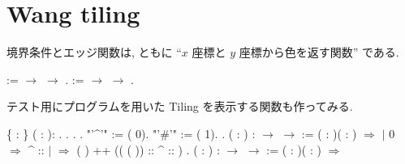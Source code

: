 \documentclass[12pt]{report}
\begin{document}
\section{Wang tiling}
境界条件とエッジ関数は, ともに ``$x$ 座標と $y$ 座標から色を返す関数'' である.
  \begin{coqdoccode}
\coqdocemptyline
\coqdocnoindent
{}  :=  \ensuremath{\rightarrow}  \ensuremath{\rightarrow} .\coqdoceol
\coqdocnoindent
{}  :=  \ensuremath{\rightarrow}  \ensuremath{\rightarrow} .\coqdoceol
\coqdocemptyline
\end{coqdoccode}

テスト用にプログラムを用いた Tiling を表示する関数も作ってみる.
  \begin{coqdoccode}
\coqdocemptyline
\coqdocnoindent
{}  \{ : \} ( : ): .\coqdoceol
\coqdocnoindent
{}.\coqdoceol
\coqdocnoindent
{} .\coqdoceol
\coqdocnoindent
{}.\coqdoceol
\coqdocnoindent
{} "'\^{}'" := ( 0).\coqdoceol
\coqdocnoindent
{} "'\#'" := ( 1).\coqdoceol
\coqdocnoindent
{}  .\coqdoceol
\coqdocnoindent
{}  ( : ) :  \ensuremath{\rightarrow}  \ensuremath{\rightarrow}   :=\coqdoceol
\coqdocindent{0.50em}
 ( : )( : ) \ensuremath{\Rightarrow}\coqdoceol
\coqdocindent{0.50em}
  \coqdoceol
\coqdocindent{1.50em}
\ensuremath{|} 0 \ensuremath{\Rightarrow} \^{} :: \coqdoceol
\coqdocindent{1.50em}
\ensuremath{|}   \ensuremath{\Rightarrow} (   ) ++ ((  ( )) :: \^{} :: )\coqdoceol
\coqdocindent{0.50em}
.\coqdoceol
\coqdocnoindent
{}  ( : ) :  \ensuremath{\rightarrow}  \ensuremath{\rightarrow}   :=\coqdoceol
\coqdocindent{0.50em}
 ( : )( : ) \ensuremath{\Rightarrow}\coqdoceol

\end{coqdoccode}
\end{document}
